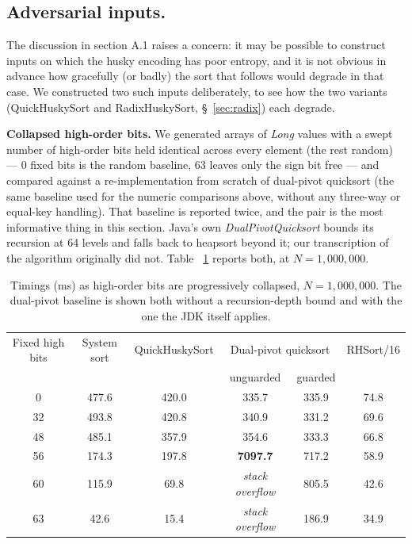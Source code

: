 \documentclass[twoside,leqno,twocolumn]{article}
\begin{document}
\subsection{Adversarial inputs.}
\label{sec:adversarial}

The discussion in section A.1 raises a concern:
it may be possible to construct inputs on which the husky encoding has poor entropy,
and it is not obvious in advance how gracefully (or badly) the sort that follows would degrade in that case.
We constructed two such inputs deliberately, to see how the two variants (QuickHuskySort and RadixHuskySort, \S~\ref{sec:radix}) each degrade.

\textbf{Collapsed high-order bits.} We generated arrays of \textit{Long} values with a swept number of high-order bits held identical across every element (the rest random) —
0 fixed bits is the random baseline, 63 leaves only the sign bit free —
and compared against a re-implementation from scratch of dual-pivot quicksort
(the same baseline used for the numeric comparisons above, without any three-way or equal-key handling).
That baseline is reported twice, and the pair is the most informative thing in this section.
Java's own \textit{DualPivotQuicksort} bounds its recursion at 64 levels and falls back to heapsort beyond it;
our transcription of the algorithm originally did not.
Table ~\ref{tab:AdversarialBits} reports both, at $N = 1{,}000{,}000$.

\begin{table}
  \caption{Timings (ms) as high-order bits are progressively collapsed, $N = 1{,}000{,}000$.
    The dual-pivot baseline is shown both without a recursion-depth bound and with the one the JDK
    itself applies.}
  \label{tab:AdversarialBits}
  \centering
  \begin{tabular}{cccccc}
    \toprule
    Fixed high bits & System sort & QuickHuskySort & \multicolumn{2}{c}{Dual-pivot quicksort} & RHSort/16 \\
     & & & unguarded & guarded & \\
    \midrule
    0  & 477.6 & 420.0 & 335.7 & 335.9 & 74.8 \\
    32 & 493.8 & 420.8 & 340.9 & 331.2 & 69.6 \\
    48 & 485.1 & 357.9 & 354.6 & 333.3 & 66.8 \\
    56 & 174.3 & 197.8 & \textbf{7097.7} & 717.2 & 58.9 \\
    60 & 115.9 & 69.8  & \textit{stack overflow} & 805.5 & 42.6 \\
    63 & 42.6  & 15.4  & \textit{stack overflow} & 186.9 & 34.9 \\
    \bottomrule
  \end{tabular}
\end{table}
\end{document}
